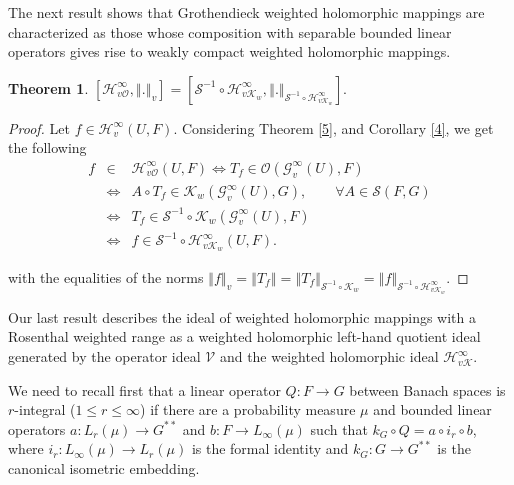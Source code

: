 \documentclass[12pt]{amsart}
\newtheorem{theorem}{Theorem}[section]
\theoremstyle{plain}
\numberwithin{equation}{section}
\begin{document}
The next result shows that Grothendieck weighted holomorphic mappings are characterized as those whose composition with separable bounded linear operators gives rise to weakly compact weighted holomorphic mappings.

\begin{theorem}
\label{7}$\left[ \mathcal{H}_{v\mathcal{O}}^{\infty },\left\Vert
.\right\Vert _{v}\right] =\left[ \mathcal S^{-1}\circ \mathcal{H}_{v\mathcal{K}_w%
}^{\infty },\left\Vert .\right\Vert _{\mathcal S^{-1}\circ \mathcal{H}_{v\mathcal{K}_w%
}^{\infty }}\right] .$
\end{theorem}

\begin{proof}
Let $f\in \mathcal{H}_{v}^{\infty }(U,F)$. Considering Theorem \ref{5}, \cite%
[Proposition 3.2.6]{Pietsch1980}
and Corollary \ref{4}, we get the following%
\begin{eqnarray*}
f &\in &\mathcal{H}_{v\mathcal{O}}^{\infty }(U,F)\Leftrightarrow T_{f}\in 
\mathcal{O}(\mathcal{G}_{v}^{\infty }(U),F) \\
&\Leftrightarrow &A\circ T_{f}\in \mathcal{K}_w\left( \mathcal{G}_{v}^{\infty
}(U),G\right) ,\qquad \forall A\in \mathcal S\left( F,G\right) \\
&\Leftrightarrow &T_{f}\in \mathcal S^{-1}\circ \mathcal{K}_w\left( \mathcal{G}%
_{v}^{\infty }(U),F\right) \\
&\Leftrightarrow &f\in \mathcal S^{-1}\circ \mathcal{H}_{v\mathcal{K}_w}^{\infty
}\left( U,F\right).
\end{eqnarray*}

with the equalities of the norms $\left\Vert f\right\Vert _{v}=\left\Vert T_{f}\right\Vert
=\left\Vert T_{f}\right\Vert _{\mathcal S^{-1}\circ \mathcal{K}_w}=\left\Vert
f\right\Vert _{\mathcal S^{-1}\circ \mathcal{H}_{v\mathcal{K}_w}^{\infty }}.$
\end{proof}





Our last result describes the ideal of weighted holomorphic mappings with a
Rosenthal weighted range as a
weighted holomorphic left-hand quotient ideal generated by the operator
ideal $\mathcal{V}$ and the weighted holomorphic ideal $\mathcal{H}_{v%
\mathcal{K}}^{\infty }.$ 

We need to recall first that a linear operator $Q:F\to G$ between Banach spaces is $r$-integral ($1\leq r\leq \infty$)  if there are a probability measure $\mu$ and bounded linear operators $a:L_r(\mu)\to G^{**}$ and $b:F\to L_\infty(\mu)$ such that $k_G\circ Q=a\circ i_r\circ b$, where $i_r:L_\infty (\mu)\to L_r(\mu)$ is the formal identity and $k_G:G\to G^{**}$ is the canonical isometric embedding.
\end{document}
